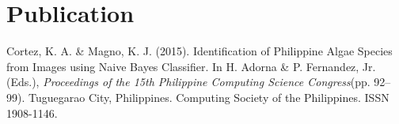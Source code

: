 \documentclass[top=0.5in]{deedy-resume-openfont}
\begin{document}
\begin{minipage}[t]{0.66\textwidth}
\section{Publication}\label{sec:publications}
\renewcommand\refname{\vskip -1.5em} %
Cortez, K. A. \& Magno, K. J. (2015). Identification of Philippine Algae Species from Images using Naive Bayes Classifier.
In H. Adorna \& P. Fernandez, Jr. (Eds.), \textit{Proceedings of the 15th Philippine Computing Science Congress}(pp. 92--99).
Tuguegarao City, Philippines. Computing Society of the Philippines. ISSN 1908-1146.
%
%

\end{minipage} 
\end{document}
